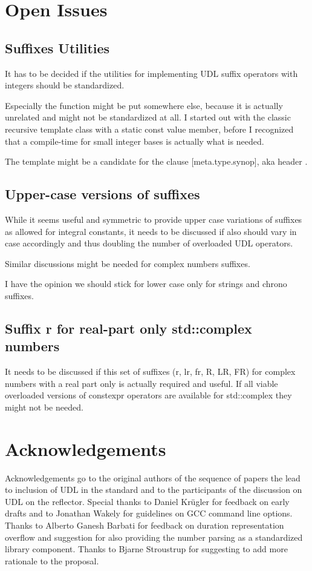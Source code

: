 \documentclass[ebook,11pt,article]{memoir}
\begin{document}
\section{Open Issues}
\subsection{Suffixes Utilities}
It has to be decided if the utilities for implementing UDL suffix operators with integers should be standardized.

Especially the  function might be put somewhere else, because it is actually unrelated and might not be standardized at all. I started out with the classic recursive template class with a static const value member, before I recognized that a compile-time  for small integer bases is actually what is needed.

The template  might be a candidate for the clause [meta.type.synop], aka header .

\subsection{Upper-case versions of suffixes}
While it seems useful and symmetric to provide upper case variations of suffixes  as allowed for integral constants, it needs to be discussed if also  should vary in case accordingly and thus doubling the number of overloaded UDL operators.

Similar discussions might be needed for complex numbers suffixes.

I have the opinion we should stick for lower case only for strings and chrono suffixes. 

\subsection{Suffix r for real-part only std::complex numbers}
It needs to be discussed if this set of suffixes (r, lr, fr, R, LR, FR) for complex numbers with a real part only is actually required and useful. If all viable overloaded versions of constexpr operators are available for std::complex they might not be needed.

\section{Acknowledgements}
Acknowledgements go to the original authors of the sequence of papers the lead to inclusion of UDL in the standard and to the participants of the discussion on UDL on the reflector. Special thanks to Daniel Kr\"ugler for feedback on early drafts and to Jonathan Wakely for guidelines on GCC command line options. Thanks to Alberto Ganesh Barbati for feedback on duration representation overflow and suggestion for also providing the number parsing as a standardized library component. Thanks to Bjarne Stroustrup for suggesting to add more rationale to the proposal.
\end{document}
